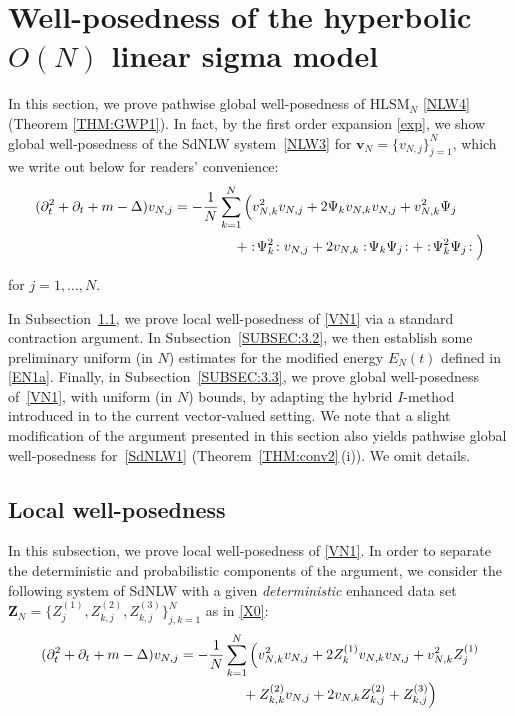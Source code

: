 \documentclass[letterpaper, 11pt,  reqno]{amsart}
\newcommand{\1}{\hspace{0.5mm}\text{I}\hspace{0.2mm}}
\newcommand{\noi}{\noindent}
\newcommand{\Dl}{\Delta}
\newcommand{\dt}{\partial_t}
\newcommand{\HLS}{$\text{HLSM}_N$ }
\newcommand{\EN}{E_N}
\newcommand{\wick}[1]{:\!{#1}\!:}
\newcommand{\vv}{\mathbf{v}}
\numberwithin{equation}{section}
\numberwithin{theorem}{section}
\begin{document}
\section{Well-posedness of the hyperbolic $O (N)$ linear sigma model}

\label{SEC:3}
In this section, we prove pathwise global 
well-posedness of 
\HLS\eqref{NLW4}
(Theorem \ref{THM:GWP1}). 
In fact, by the first order expansion \eqref{exp}, we show global well-posedness of the SdNLW 
system~\eqref{NLW3} for 
$\vv_N = \{v_{N, j}\}_{j = 1}^N$, which we write out below for readers' convenience:
\begin{align}
\begin{split}
(\dt^2 + \dt + m - \Dl) v_{N, j} 
& = - \frac{1}{N} \sum_{k = 1}^N  \Big( 
v_{N, k}^2 v_{N, j}
+ 2 \Psi_k v_{N, k} v_{N, j}
  + v_{N, k}^2 \Psi_j \\
& 
\hphantom{XXXXX}
 + \wick{\Psi_k^2} v_{N, j} + 2 v_{N, k} \wick{ \Psi_k \Psi_j } 
+ \wick{\Psi_k^2 \Psi_j} \Big)
\end{split}
\label{VN1}
\end{align}


\noi
for $j = 1, \dots, N$.








In Subsection~\ref{SUBSEC:3.1}, we prove local well-posedness of \eqref{VN1} via a standard 
contraction  argument. 
In Subsection~\ref{SUBSEC:3.2}, we then establish some preliminary uniform
(in $N$) estimates for the modified energy 
$\EN (t) $
defined in  \eqref{EN1a}.
Finally, in Subsection~\ref{SUBSEC:3.3}, 
we prove global well-posedness of~\eqref{VN1}, 
with uniform (in $N$) bounds, 
by adapting
the hybrid $I$-method introduced in \cite{GKOT}
to the current vector-valued setting.
We note that a slight modification of the argument presented in this section also yields
pathwise global well-posedness for~\eqref{SdNLW1}
(Theorem~\ref{THM:conv2}\,(i)).
We omit details.






\subsection{Local well-posedness}
\label{SUBSEC:3.1}


In this subsection, we prove local well-posedness
of \eqref{VN1}.
In order to separate the deterministic and probabilistic components
of the argument, we
consider the following system
of SdNLW
with a given {\it deterministic} 
enhanced data set
$\pmb Z_N = \big\{Z_j^{(1)},  Z_{k, j}^{(2)}, Z_{k, j}^{(3)}\big\}_{j, k = 1}^N$
as in 
\eqref{X0}:
\begin{align}
\begin{split}
(\dt^2 + \dt + m - \Dl) v_{N, j} 
& = - \frac{1}{N} \sum_{k = 1}^N  \Big( 
v_{N, k}^2 v_{N, j}
+ 2 Z_{k}^{(1)} v_{N, k} v_{N, j} + v_{N, k}^2 Z_{j}^{(1)}\\
&\hphantom{XXXXX}
 + 
 Z_{k, k}^{(2)} v_{N, j} + 2 v_{N, k} Z_{k, j}^{(2)}
+  Z_{k, j}^{(3)} \Big)
\end{split}
\label{VN2}
\end{align}
\end{document}
